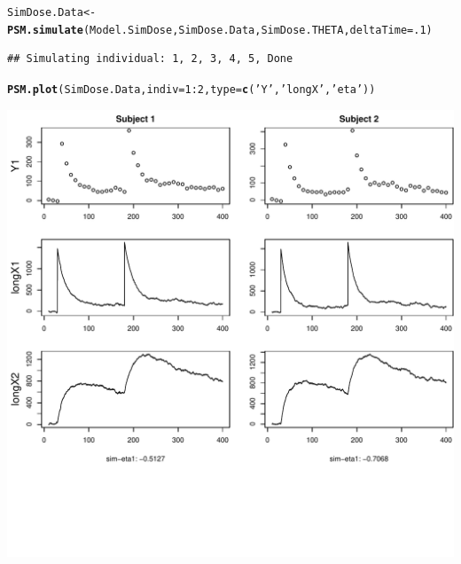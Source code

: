 \documentclass[a4paper,11pt]{article}\usepackage[]{graphicx}\usepackage[]{color}
\makeatletter
\def\maxwidth{ %
  \ifdim\Gin@nat@width>\linewidth
    \linewidth
  \else
    \Gin@nat@width
  \fi
}
\newcommand{\hlnum}[1]{\textcolor[rgb]{0.686,0.059,0.569}{#1}}%
\newcommand{\hlstr}[1]{\textcolor[rgb]{0.192,0.494,0.8}{#1}}%
\newcommand{\hlopt}[1]{\textcolor[rgb]{0,0,0}{#1}}%
\newcommand{\hlstd}[1]{\textcolor[rgb]{0.345,0.345,0.345}{#1}}%
\newcommand{\hlkwb}[1]{\textcolor[rgb]{0.69,0.353,0.396}{#1}}%
\newcommand{\hlkwc}[1]{\textcolor[rgb]{0.333,0.667,0.333}{#1}}%
\newcommand{\hlkwd}[1]{\textcolor[rgb]{0.737,0.353,0.396}{\textbf{#1}}}%
\newenvironment{kframe}{%
 \def\at@end@of@kframe{}%
 \ifinner\ifhmode%
  \def\at@end@of@kframe{\end{minipage}}%
  \begin{minipage}{\columnwidth}%
 \fi\fi%
 \def\FrameCommand##1{\hskip\@totalleftmargin \hskip-\fboxsep
 \colorbox{shadecolor}{##1}\hskip-\fboxsep
     \hskip-\linewidth \hskip-\@totalleftmargin \hskip\columnwidth}%
 \MakeFramed {\advance\hsize-\width
   \@totalleftmargin\z@ \linewidth\hsize
   \@setminipage}}%
 {\par\unskip\endMakeFramed%
 \at@end@of@kframe}
\newenvironment{knitrout}{}{} %
\makeatother
\begin{document}
\begin{knitrout}
\color{fgcolor}\begin{kframe}
\begin{alltt}
\hlstd{SimDose.Data} \hlkwb{<-} \hlkwd{PSM.simulate}\hlstd{(Model.SimDose, SimDose.Data, SimDose.THETA,} \hlkwc{deltaTime}\hlstd{=}\hlnum{.1}\hlstd{)}
\end{alltt}
\begin{verbatim}
## Simulating individual: 1, 2, 3, 4, 5, Done
\end{verbatim}
\begin{alltt}
\hlkwd{PSM.plot}\hlstd{(SimDose.Data,}\hlkwc{indiv}\hlstd{=}\hlnum{1}\hlopt{:}\hlnum{2}\hlstd{,}\hlkwc{type}\hlstd{=}\hlkwd{c}\hlstd{(}\hlstr{'Y'}\hlstd{,}\hlstr{'longX'}\hlstd{,}\hlstr{'eta'}\hlstd{))}
\end{alltt}
\end{kframe}
\includegraphics[width=\maxwidth]{figure/PSM_simulate-1} 

\end{knitrout}
\end{document}
